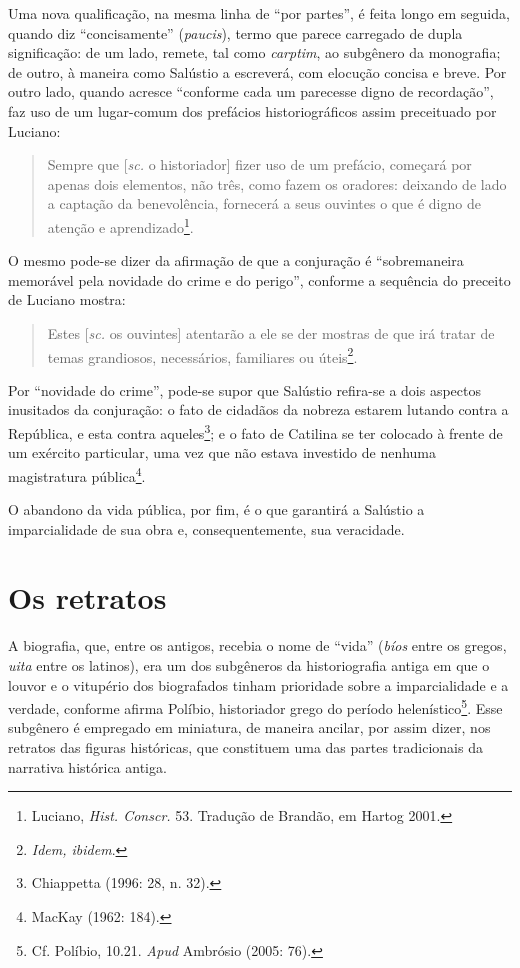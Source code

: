 Uma nova qualificação, na mesma linha de ``por partes'', é feita longo em
seguida, quando diz “concisamente” (\emph{paucis}), termo que parece carregado de dupla
significação: de um lado, remete, tal como \emph{carptim}, ao subgênero da
monografia; de outro, à maneira como Salústio a escreverá, com elocução concisa e breve. Por outro lado, quando acresce “conforme cada um
parecesse digno de recordação”, faz uso de um lugar-comum dos prefácios
historiográficos assim preceituado por Luciano:

 

\begin{quote} Sempre que [\emph{sc.} o historiador] fizer uso de um prefácio,
  começará por apenas dois elementos, não três, como fazem os oradores:
  deixando de lado a captação da benevolência, fornecerá a seus ouvintes o que
  é digno de atenção e aprendizado\footnote{Luciano, \emph{Hist. Conscr.} 53. Tradução de Brandão, em Hartog 2001.}. 

\end{quote}

O mesmo pode-se dizer da afirmação de que a conjuração é “sobremaneira
memorável pela novidade do crime e do perigo”, conforme a sequência do preceito
de Luciano mostra:

\begin{quote}

Estes [\emph{sc.} os ouvintes] atentarão a ele se der mostras de que irá tratar
de temas grandiosos, necessários, familiares ou úteis\footnote{\emph{Idem,
ibidem}.}.

\end{quote}

 
Por “novidade do crime”, pode-se supor que Salústio refira-se a dois
aspectos inusitados da conjuração: o fato de cidadãos da nobreza estarem
lutando contra a República, e esta contra aqueles\footnote{Chiappetta (1996:
28, n. 32).}; e o fato de Catilina se ter colocado à frente de um exército
particular, uma vez que não estava investido de nenhuma magistratura
pública\footnote{MacKay (1962: 184).}.

O abandono da vida pública, por fim, é o que garantirá a Salústio a imparcialidade de sua obra e, consequentemente, sua veracidade. 

\section{Os retratos}

A biografia, que, entre os antigos, recebia o nome de “vida” (\emph{bíos} entre
os gregos, \emph{uita} entre os latinos), era um dos subgêneros da
historiografia antiga em que o louvor e o vitupério dos biografados tinham
prioridade sobre a imparcialidade e a verdade, conforme afirma 
Políbio, historiador grego do período helenístico\footnote{Cf. Políbio, 10.21. \emph{Apud} Ambrósio (2005: 76).}. 
Esse subgênero é empregado em miniatura, de maneira ancilar, por assim dizer, nos retratos das
figuras históricas, que constituem uma das partes tradicionais da narrativa
histórica antiga.

